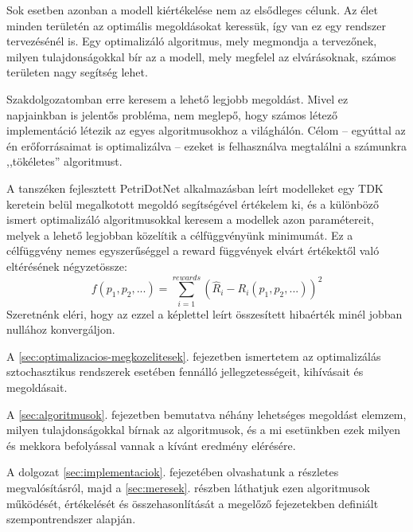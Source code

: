 Sok esetben azonban a modell kiértékelése nem az elsődleges célunk. Az élet minden területén az optimális megoldásokat keressük, így van ez egy rendszer tervezésénél is. Egy optimalizáló algoritmus, mely megmondja a tervezőnek, milyen tulajdonságokkal bír az a modell, mely megfelel az elvárásoknak, számos területen nagy segítség lehet.

Szakdolgozatomban erre keresem a lehető legjobb megoldást. Mivel ez napjainkban is jelentős probléma, nem meglepő, hogy számos létező implementáció létezik az egyes algoritmusokhoz a világhálón. Célom -- egyúttal az én erőforrásaimat is optimalizálva -- ezeket is felhasználva megtalálni a számunkra ,,tökéletes'' algoritmust.

A tanszéken fejlesztett PetriDotNet alkalmazásban leírt modelleket egy TDK keretein belül megalkotott megoldó\cite{SpdnTDK} segítségével értékelem ki, és a különböző ismert optimalizáló algoritmusokkal keresem a modellek azon paramétereit, melyek a lehető legjobban közelítik a célfüggvényünk minimumát. Ez a célfüggvény nemes egyszerűséggel a reward függvények elvárt értékektől való eltérésének négyzetössze:
\begin{equation}
	\label{eq:celfgv}
	f(p_1,p_2,...)=\sum_{i=1}^{rewards}\left( \hat{R}_i-R_i(p_1,p_2,...)\right) ^2
\end{equation}
Szeretnénk eléri, hogy az ezzel a képlettel leírt összesített hibaérték minél jobban nullához konvergáljon.

A \ref{sec:optimalizacios-megkozelitesek}. fejezetben ismertetem az optimalizálás sztochasztikus rendszerek esetében fennálló jellegzetességeit, kihívásait és megoldásait.

A \ref{sec:algoritmusok}. fejezetben bemutatva néhány lehetséges megoldást elemzem, milyen tulajdonságokkal bírnak az algoritmusok, és a mi esetünkben ezek milyen és mekkora befolyással vannak a kívánt eredmény elérésére.

A dolgozat \ref{sec:implementaciok}. fejezetében olvashatunk a részletes megvalósításról, majd a \ref{sec:meresek}. részben láthatjuk ezen algoritmusok működését, értékelését és összehasonlítását a megelőző fejezetekben definiált szempontrendszer alapján.